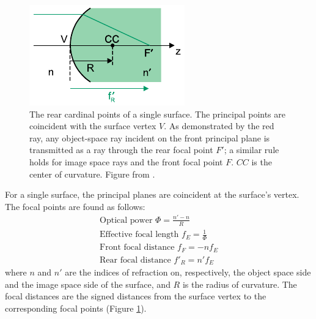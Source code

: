 \documentclass[twocolumn]{article}
\begin{document}
\begin{figure}[ht]
    \centering
    \includegraphics[width=.45\textwidth]{img/surface_cardinal_points.png}
    \caption{The rear cardinal points of a single surface. The principal
    points are coincident with the surface vertex $V$. As demonstrated by the red
    ray, any object-space ray incident on the front principal plane is transmitted
    as a ray through the rear focal point $F'$; a similar rule holds for image space
    rays and the front focal point $F$. $CC$ is the center of curvature. Figure from
    \cite{Greivenkamp2004}.}
    \label{fig:surface_cardinal_points}
\end{figure}

For a single surface, the principal planes are coincident at the surface's vertex.
The focal points are found as follows:
\begin{gather*}
    \text{Optical power } \Phi = \frac{n' - n}{R} \\
    \text{Effective focal length } f_E = \frac{1}{\Phi} \\
    \text{Front focal distance } f_F = -nf_E \\
    \text{Rear focal distance } f'_R = n'f_E
\end{gather*}
where $n$ and $n'$ are the indices of refraction on, respectively, the object space
side and the image space side of the surface, and $R$ is the radius of curvature. The
focal distances are the signed
distances from the surface vertex to the corresponding focal points (Figure
\ref{fig:surface_cardinal_points}).
\end{document}
